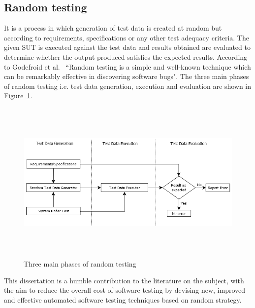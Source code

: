 \subsection{Random testing} 
It is a process in which generation of test data is created at random but according to requirements, specifications or any other test adequacy criteria. The given SUT is executed against the test data and results obtained are evaluated to determine whether the output produced satisfies the expected results. According to Godefroid et al.~\cite{godefroid2005dart} ``Random testing is a simple and well-known technique which can be remarkably effective in discovering software bugs". The three main phases of random testing i.e. test data generation, execution and evaluation are shown in Figure~\ref{fig:SoftwareTesting1}.
\\
\begin{figure}[h]
	\centering
		\includegraphics[width=15.3cm, height=8cm ]{chapter1/SoftwareTesting1.png}
		\bigskip
		\caption{Three main phases of random testing}
	\label{fig:SoftwareTesting1}
\end{figure}

This dissertation is a humble contribution to the literature on the subject, with the aim to reduce the overall cost of software testing by devising new, improved and effective automated software testing techniques based on random strategy.
\newpage
